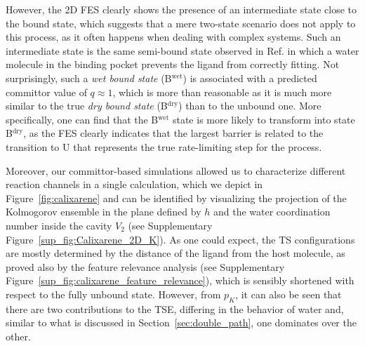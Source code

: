     However, the 2D FES clearly shows the presence of an intermediate state close to the bound state, which suggests that a mere two-state scenario does not apply to this process, as it often happens when dealing with complex systems.
    Such an intermediate state is the same semi-bound state observed in Ref. in which a water molecule in the binding pocket prevents the ligand from correctly fitting.
    Not surprisingly, such a \emph{wet bound state} (B$^{\text{wet}}$) is associated with a predicted committor value of $q\approx1$, which is more than reasonable as it is much more similar to the true \emph{dry bound state} (B$^{\text{dry}}$) than to the unbound one.
    More specifically, one can find that the B$^{\text{wet}}$ state is more likely to transform into state B$^{\text{dry}}$, as the FES clearly indicates that the largest barrier is related to the transition to U that represents the true rate-limiting step for the process.  

    
    Moreover, our committor-based simulations allowed us to characterize different reaction channels in a single calculation, which we depict in Figure~\ref{fig:calixarene} and can be identified by visualizing the projection of the Kolmogorov ensemble in the plane defined by $h$ and the water coordination number inside the cavity $V_2$ (see Supplementary Figure~\ref{sup_fig:Calixarene_2D_K}).
    As one could expect, the TS configurations are mostly determined by the distance of the ligand from the host molecule, as proved also by the feature relevance analysis (see Supplementary Figure~\ref{sup_fig:calixarene_feature_relevance}), which is sensibly shortened with respect to the fully unbound state.
    However, from $p_K$, it can also be seen that there are two contributions to the TSE, differing in the behavior of water and, similar to what is discussed in Section~\ref{sec:double_path}, one dominates over the other.

